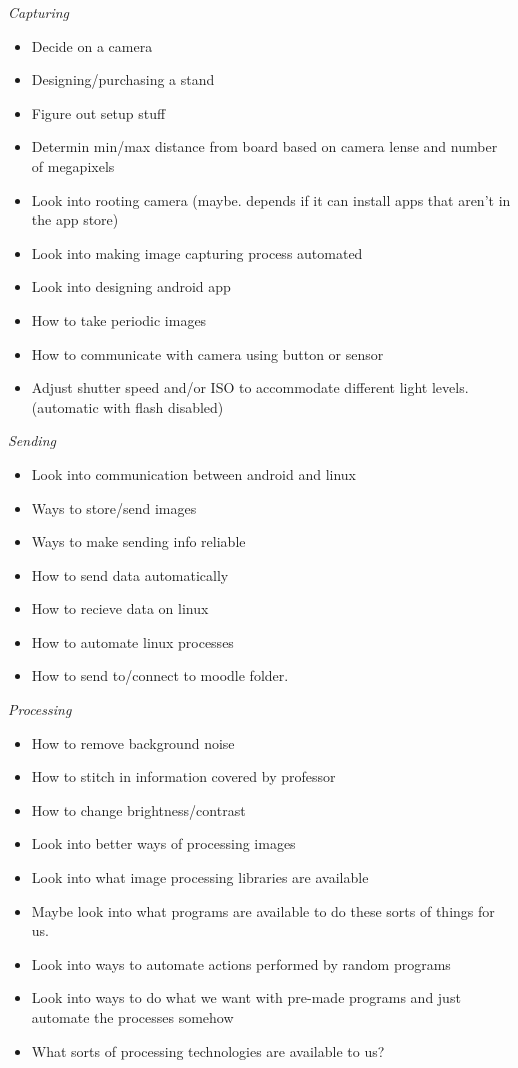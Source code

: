 \documentclass[]{article}
\begin{document}
			\emph{Capturing} 
			\begin{itemize}
				\item Decide on a camera
				\item Designing/purchasing a stand
				\item Figure out setup stuff
				\item Determin min/max distance from board based on camera lense and number of megapixels
				\item Look into rooting camera (maybe. depends if it can install apps that aren't in the app store)
				\item Look into making image capturing process automated
				\item Look into designing android app
				\item How to take periodic images
				\item How to communicate with camera using button or sensor
				\item Adjust shutter speed and/or ISO to accommodate different light levels. (automatic with flash disabled)
			\end{itemize} 
			
			\emph{Sending}
			\begin{itemize}
				\item Look into communication between android and linux
				\item Ways to store/send images
				\item Ways to make sending info reliable
				\item How to send data automatically
				\item How to recieve data on linux
				\item How to automate linux processes
				\item How to send to/connect to moodle folder.
			\end{itemize}
			
			\emph{Processing}
			\begin{itemize}
				\item How to remove background noise
				\item How to stitch in information covered by professor
				\item How to change brightness/contrast
				\item Look into better ways of processing images
				\item Look into what image processing libraries are available
				\item Maybe look into what programs are available to do these sorts of things for us.
				\item Look into ways to automate actions performed by random programs
				\item Look into ways to do what we want with pre-made programs and just automate the processes somehow
				\item What sorts of processing technologies are available to us?
			\end{itemize}
\end{document}
